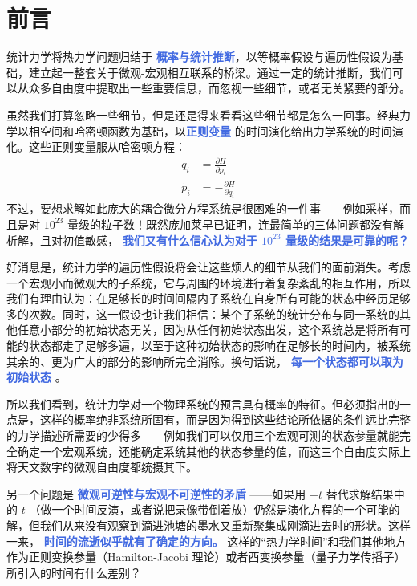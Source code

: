 \documentclass[hyperref,UTF-8]{ctexart}
\newcommand{\0}{\boldsymbol{0}}
\begin{document}
\section{前言}

统计力学将热力学问题归结于 \textcolor{RoyalBlue}{\textbf{\kaishu 概率与统计推断}}，以等概率假设与遍历性假设为基础，建立起一整套关于微观-宏观相互联系的桥梁。通过一定的统计推断，我们可以从众多自由度中提取出一些重要信息，而忽视一些细节，或者无关紧要的部分\cite{suyu}。

虽然我们打算忽略一些细节，但是还是得来看看这些细节都是怎么一回事。经典力学以相空间和哈密顿函数为基础，以\textcolor{RoyalBlue}{\textbf{\kaishu 正则变量}} 的时间演化给出力学系统的时间演化。这些正则变量服从哈密顿方程：
\begin{align}
    \dot{q_i} &= \frac{\partial H}{\partial p_i} \\
    \dot{p_i} &= -\frac{\partial H}{\partial q_i}
\end{align}
不过，要想求解如此庞大的耦合微分方程系统是很困难的一件事——例如采样，而且是对 $10^{23}$ 量级的粒子数！既然庞加莱早已证明，连最简单的三体问题都没有解析解，且对初值敏感， \textcolor{RoyalBlue}{\textbf{ \kaishu 我们又有什么信心认为对于 $10^{23}$ 量级的结果是可靠的呢？}}

好消息是，统计力学的遍历性假设将会让这些烦人的细节从我们的面前消失。考虑一个宏观小而微观大的子系统，它与周围的环境进行着复杂紊乱的相互作用，所以我们有理由认为：在足够长的时间间隔内子系统在自身所有可能的状态中经历足够多的次数\cite{lan}。同时，这一假设也让我们相信：某个子系统的统计分布与同一系统的其他任意小部分的初始状态无关，因为从任何初始状态出发，这个系统总是将所有可能的状态都走了足够多遍，以至于这种初始状态的影响在足够长的时间内，被系统其余的、更为广大的部分的影响所完全消除。换句话说， \textcolor{RoyalBlue}{\textbf{\kaishu 每一个状态都可以取为初始状态}} 。

所以我们看到，统计力学对一个物理系统的预言具有概率的特征。但必须指出的一点是，这样的概率绝非系统所固有，而是因为得到这些结论所依据的条件远比完整的力学描述所需要的少得多——例如我们可以仅用三个宏观可测的状态参量就能完全确定一个宏观系统，还能确定系统其他的状态参量的值，而这三个自由度实际上将天文数字的微观自由度都统摄其下。

另一个问题是 \textcolor{RoyalBlue}{\textbf{\kaishu 微观可逆性与宏观不可逆性的矛盾 }}——如果用 $-t$ 替代求解结果中的 $t$ （做一个时间反演，或者说把录像带倒着放）仍然是演化方程的一个可能的解，但我们从来没有观察到滴进池塘的墨水又重新聚集成刚滴进去时的形状。这样一来， \textcolor{RoyalBlue}{\textbf{\kaishu 时间的流逝似乎就有了确定的方向。}} 这样的“热力学时间”和我们其他地方作为正则变换参量（Hamilton-Jacobi 理论）或者酉变换参量（量子力学传播子）所引入的时间有什么差别？
\end{document}
